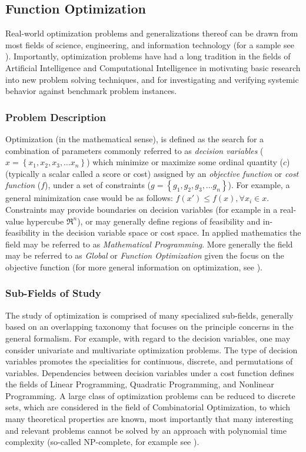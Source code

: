 \documentclass[a4paper, 11pt]{article}
\begin{document}
% 
%
\subsection{Function Optimization}
\label{subsec:function_optimization}
Real-world optimization problems and generalizations thereof can be drawn from most fields of science, engineering, and information technology (for a sample see \cite{Ali1997, Toern1999}). Importantly, optimization problems have had a long tradition in the fields of Artificial Intelligence and Computational Intelligence in motivating basic research into new problem solving techniques, and for investigating and verifying systemic behavior against benchmark problem instances.

%
%
\subsubsection{Problem Description}
Optimization (in the mathematical sense), is defined as the search for a combination of parameters commonly referred to as \emph{decision variables} ($x = \left\{x_1, x_2, x_3, \ldots x_n\right\}$) which minimize or maximize some ordinal quantity ($c$) (typically a scalar  called a score or cost) assigned by an \emph{objective function} or \emph{cost function} ($f$), under a set of constraints ($g = \left\{g_1, g_2, g_3, \ldots g_n\right\}$). For example, a general minimization case would be as follows: $f(x\prime) \leq f(x), \forall x_i \in x$. Constraints may provide boundaries on decision variables (for example in a real-value hypercube $\Re^n$), or may generally define regions of feasibility and in-feasibility in the decision variable space or cost space. In applied mathematics the field may be referred to as \emph{Mathematical Programming}. More generally the field may be referred to as \emph{Global} or \emph{Function Optimization} given the focus on the objective function (for more general information on optimization, see \cite{Horst2000}). 

%
%
\subsubsection{Sub-Fields of Study}
The study of optimization is comprised of many specialized sub-fields, generally based on an overlapping taxonomy that focuses on the principle concerns in the general formalism. 
For example, with regard to the decision variables, one may consider univariate and multivariate optimization problems. The type of decision variables promotes the specialities for continuous, discrete, and permutations of variables. Dependencies between decision variables under a cost function defines the fields of Linear Programming, Quadratic Programming, and Nonlinear Programming. A large class of optimization problems can be reduced to discrete sets, which are considered in the field of Combinatorial Optimization, to which many theoretical properties are known, most importantly that many interesting and relevant problems cannot be solved by an approach with polynomial time complexity (so-called NP-complete, for example see \cite{Papadimitriou1998}).
\end{document}
